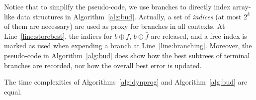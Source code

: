 \documentclass{llncs}
\newcommand{\afeat}[0]{\ensuremath{f}}
\newcommand{\abranch}[0]{\ensuremath{b}}
\newcommand{\mdepth}[0]{\ensuremath{k}}
\newcommand{\grow}[2]{\ensuremath{{#1}\oplus{#2}}}
\begin{document}
Notice that to simplify the pseudo-code, we use branches to directly index array-like data structures in Algorithm~\ref{alg:bud}. Actually, a set of \emph{indices} (at most $2^{\mdepth}$ of them are necessary) are used as proxy for branches in all contexts. At Line~\ref{line:storebest}, the indices for $\grow{\abranch}{\afeat}$, $\grow{\abranch}{\bar{\afeat}}$ are released, and a free index is marked as used when expending a branch at Line~\ref{line:branching}. Moreover, the pseudo-code in Algorithm~\ref{alg:bud} does show how the best subtrees of terminal branches are recorded, nor how the overall best error is updated.






		

		\begin{theorem}
			The time complexities of Algorithms~\ref{alg:dynprog} and Algorithm~\ref{alg:bud} are equal.
			\end{theorem}
			
\end{document}
